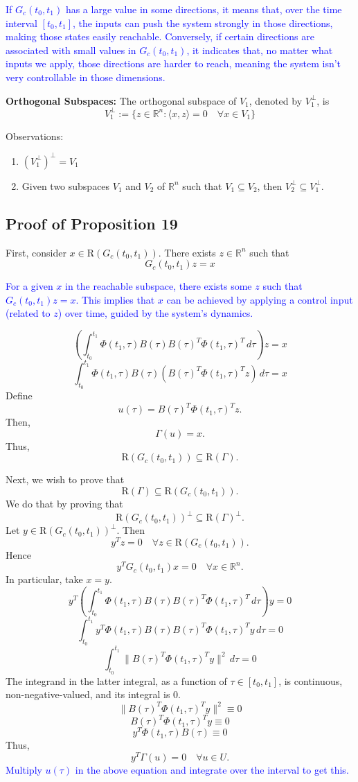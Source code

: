 \documentclass{article}
\begin{document}
\textcolor{blue}{If $G_c(t_0, t_1)$ has a large value in some directions, it means that, over the time interval $[t_0, t_1]$, the inputs can push the system strongly in those directions, making those states easily reachable. Conversely, if certain directions are associated with small values in $G_c(t_0, t_1)$, it indicates that, no matter what inputs we apply, those directions are harder to reach, meaning the system isn't very controllable in those dimensions.}

\textbf{Orthogonal Subspaces:}
The orthogonal subspace of $V_1$, denoted by $V_1^\perp$, is
\[
V_1^\perp := \{ z \in \mathbb{R}^n : \langle x, z \rangle = 0 \quad \forall x \in V_1 \}
\]

Observations:
\begin{enumerate}
    \item $(V_1^\perp)^\perp = V_1$
    \item Given two subspaces $V_1$ and $V_2$ of $\mathbb{R}^n$ such that $V_1 \subseteq V_2$, then $V_2^\perp \subseteq V_1^\perp$.
\end{enumerate}

\subsection{Proof of Proposition 19}
First, consider $x \in \text{R}(G_c(t_0, t_1))$.
There exists $z \in \mathbb{R}^n$ such that
\[
G_c(t_0, t_1)z = x
\]

\textcolor{blue}{For a given $x$ in the reachable subspace, there exists some $z$ such that $G_c(t_0, t_1)z = x$. This implies that $x$ can be achieved by applying a control input (related to $z$) over time, guided by the system's dynamics.}

\[
\left( \int_{t_0}^{t_1} \Phi(t_1, \tau) B(\tau) B(\tau)^T \Phi(t_1, \tau)^T \, d\tau \right) z = x
\]
\[
\int_{t_0}^{t_1} \Phi(t_1, \tau) B(\tau) \left( B(\tau)^T \Phi(t_1, \tau)^T z \right) \, d\tau = x
\]
Define
\[
u(\tau) = B(\tau)^T \Phi(t_1, \tau)^T z.
\]
Then,
\[
\Gamma(u) = x.
\]
Thus,
\[
\text{R}(G_c(t_0, t_1)) \subseteq \text{R}(\Gamma).
\]

Next, we wish to prove that
\[
\text{R}(\Gamma) \subseteq \text{R}(G_c(t_0, t_1)).
\]
We do that by proving that
\[
\text{R}(G_c(t_0, t_1))^\perp \subseteq \text{R}(\Gamma)^\perp.
\]
Let $y \in \text{R}(G_c(t_0, t_1))^\perp$. Then
\[
y^T z = 0 \quad \forall z \in \text{R}(G_c(t_0, t_1)).
\]
Hence
\[
y^T G_c(t_0, t_1) x = 0 \quad \forall x \in \mathbb{R}^n.
\]
In particular, take $x = y$.
\[
y^T \left( \int_{t_0}^{t_1} \Phi(t_1, \tau) B(\tau) B(\tau)^T \Phi(t_1, \tau)^T \, d\tau \right) y = 0
\]
\[
\int_{t_0}^{t_1} y^T \Phi(t_1, \tau) B(\tau) B(\tau)^T \Phi(t_1, \tau)^T y \, d\tau = 0
\]
\[
\int_{t_0}^{t_1} \| B(\tau)^T \Phi(t_1, \tau)^T y \|^2 \, d\tau = 0
\]
The integrand in the latter integral, as a function of $\tau \in [t_0, t_1]$, is continuous, non-negative-valued, and its integral is 0.
\[
\| B(\tau)^T \Phi(t_1, \tau)^T y \|^2 \equiv 0
\]
\[
B(\tau)^T \Phi(t_1, \tau)^T y \equiv 0
\]
\[
y^T \Phi(t_1, \tau) B(\tau) \equiv 0
\]
Thus,
\[
y^T \Gamma(u) = 0 \quad \forall u \in U.
\]
\textcolor{blue}{Multiply $u(\tau)$ in the above equation and integrate over the interval to get this.}
\end{document}
